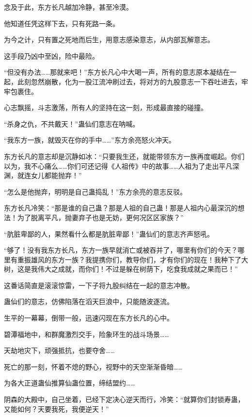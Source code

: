 \begin{this_body}
念及于此，东方长凡越加冷静，甚至冷漠。

他知道任凭这样下去，只有死路一条。

为今之计，只有置之死地而后生，用意志感染意志，从内部瓦解意志。

这手段乃凶中至凶，险中最险。

“但没有办法……那就来吧！”东方长凡心中大喝一声，所有的意志原本凝结在一起，此刻忽然崩散，化为一股江流冲刷过去，将对方的九股意志一下吞吐进去，牢牢包裹住。

心志飘摇，斗志激荡，所有人的坚持在这一刻，形成最直接的碰撞。

“杀身之仇，不共戴天！”蛊仙们意志在呐喊。

“我东方一族，就毁灭在你的手中……”东方余亮怒火冲天。

东方长凡的意志却是沉静如冰：“只要我生还，就能带领东方一族再度崛起。你们以为，我不心痛么……你们可还记得《人祖传》中的故事……人祖为了走出平凡深渊，就连女儿都能抛弃！”

“怎么是他抛弃，明明是自己蛊捣乱！”东方余亮的意志反驳。

东方长凡冷笑：“那是谁的自己蛊？那是人祖的自己蛊！那是人祖内心最深沉的想法！为了脱离平凡，抛妻弃子也是无妨，更何况区区家族？”

“肮脏卑鄙的人，果然看什么都是肮脏卑鄙！”蛊仙们的意志齐声怒吼。

“够了！没有我东方长凡，东方一族早就消亡或被吞并了，哪里有你们的今天？哪里有重振雄风的东方一族？我提携你们，教导你们，才有你们的现在！我种下了大树，这是我伟大之成就，而你们！不过是躲在树荫下，吃食我成就之果而已！”

这番话简直是滚滚惊雷，一下子将九股纠结在一起的意志冲散。

蛊仙们的意志，仿佛陷落在滔天巨浪中，只能随波逐流。

生平的一幕幕，倒带一般，迅速闪现在东方长凡的心中。

碧潭福地中，和群魔激烈交手，险象环生的战斗场景……

天劫地灾下，顽强抵抗，也要夺舍……

死亡的那一刻，怀着不熄的野心，视野中的天空渐渐昏暗……

为各大正道蛊仙推算仙蛊位置，缔结盟约……

阴森的大殿中，自己坐着，已经下定决心逆天而行，冷笑：“就算你们封锁寿蛊，又能如何？天要我死，我便逆天！”

\end{this_body}

